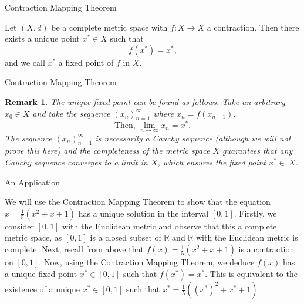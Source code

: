 \documentclass{beamer}
\newtheorem*{remark}{Remark}
\begin{document}
\begin{frame}{Contraction Mapping Theorem}
\begin{theorem}
Let $(X,d)$ be a complete metric space with $f:X\to X$ a contraction. Then there exists a unique point $x^{*}\in X$ such that $$f(x^{*})=x^{*}\text{,}$$ and we call $x^{*}$ a fixed point of $f$ in $X$.
\end{theorem}


\end{frame}

\begin{frame}{Contraction Mapping Theorem}
\begin{remark}
The unique fixed point can be found as follows. Take an arbitrary $x_{0}\in X$ and take the sequence $(x_{n})_{n=1}^{\infty}$ where $x_{n}=f(x_{n-1})$.  $$\text{Then, }\lim_{n\to\infty}x_{n}=x^{*}.$$
The sequence $(x_{n})_{n=1}^{\infty}$ is necessarily a Cauchy sequence (although we will not prove this here) and the completeness of the metric space $X$ guarantees that any Cauchy sequence converges to a limit in $X$, which ensures the fixed point $x^{*}\in\ X$.
\end{remark}
    
\end{frame}

\begin{frame}{An Application}
\begin{example}
We will use the Contraction Mapping Theorem to show that the equation $x=\frac{1}{5}(x^{2}+x+1)$ has a unique solution in the interval $[0,1]$. \newline  Firstly, we consider $[0,1]$ with the Euclidean metric and observe that this a complete metric space, as $[0,1]$ is a closed subset of $\mathbb{R}$ and $\mathbb{R}$ with the Euclidean metric is complete. Next, recall from above that $f(x)=\frac{1}{5}(x^{2}+x+1)$ is a contraction on $[0,1]$. Now, using the Contraction Mapping Theorem, we deduce $f(x)$ has a unique fixed point $x^{*}\in[0,1]$ such that $f(x^{*})=x^{*}$. This is equivalent to the existence of a unique $x^{*}\in[0,1]$ such that $x^{*}=\frac{1}{5}((x^{*})^{2}+x^{*}+1)$.
\end{example}    
\end{frame}
\end{document}
